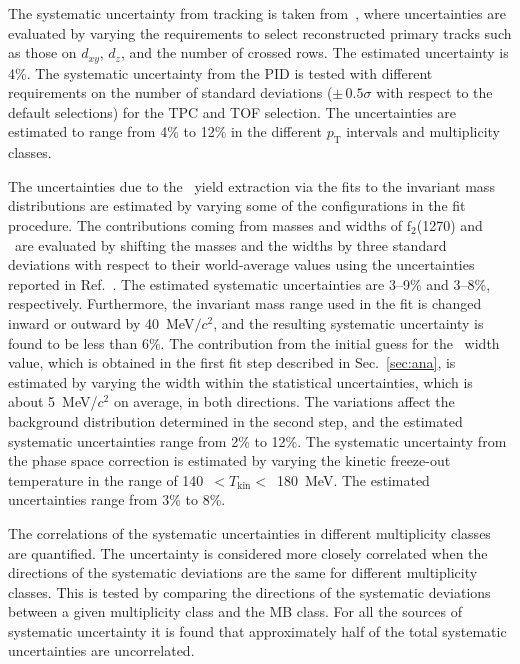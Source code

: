 The systematic uncertainty from tracking is taken from~\cite{ALICE:2013wgn}, where uncertainties are evaluated by varying the requirements to select reconstructed primary tracks such as those on $d_{xy}$, $d_{z}$, and the number of crossed rows. The estimated uncertainty is 4\%. The systematic uncertainty from the PID is tested with different requirements on the number of standard deviations ($\pm\,0.5\sigma$ with respect to the default selections) for the TPC and TOF selection. The uncertainties are estimated to range from 4\% to 12\% in the different $p_{\mathrm{T}}$ intervals and multiplicity classes.

The uncertainties due to the \fzero~yield extraction via the fits to the invariant mass distributions are estimated by varying some of the configurations in the fit procedure. The contributions coming from masses and widths of $\mathrm{f}_{2}$(1270) and \rhoz~are evaluated by shifting the masses and the widths by three standard deviations with respect to their world-average values using the uncertainties reported in Ref.~\cite{ParticleDataGroup:2022pth}. The estimated systematic uncertainties are 3--9\% and 3--8\%, respectively. Furthermore, the invariant mass range used in the fit is changed inward or outward by 40~MeV$/c^{2}$, and the resulting systematic uncertainty is found to be less than 6\%. The contribution from the initial guess for the \fzero~width value, which is obtained in the first fit step described in Sec.~\ref{sec:ana}, is estimated by varying the width within the statistical uncertainties, which is about 5~MeV/$c{^2}$ on average, in both directions. The variations affect the background distribution determined in the second step, and the estimated systematic uncertainties range from 2\% to 12\%. The systematic uncertainty from the phase space correction is estimated by varying the kinetic freeze-out temperature in the range of 140~$<T_{\mathrm{kin}}<$~180~MeV. The estimated uncertainties range from 3\% to 8\%. 

The correlations of the systematic uncertainties in different multiplicity classes are quantified. The uncertainty is considered more closely correlated when the directions of the systematic deviations are the same for different multiplicity classes. This is tested by comparing the directions of the systematic deviations between a given multiplicity class and the MB class. For all the sources of systematic uncertainty it is found that approximately half of the total systematic uncertainties are uncorrelated.